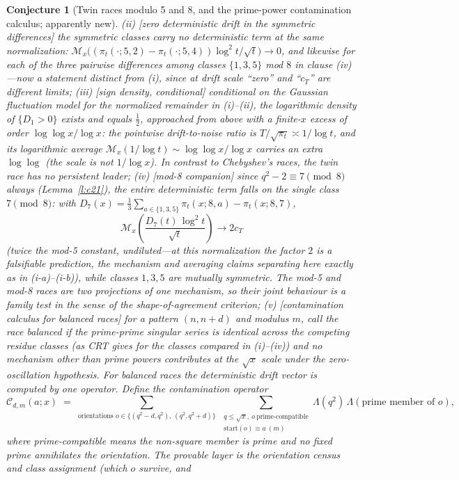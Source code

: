 \documentclass[11pt]{article}
\newtheorem{conjecture}{Conjecture}
\theoremstyle{definition}
\newcommand{\M}{\mathcal M}
\begin{document}
\begin{conjecture}[Twin races modulo 5 and 8, and the prime-power
contamination calculus; apparently new]
\emph{(ii)} [zero deterministic drift in the symmetric differences]
the symmetric classes carry no deterministic term \emph{at the same
normalization}:
$\M_x\bigl((\pi_t(\cdot;5,2)-\pi_t(\cdot;5,4))\log^2t/\sqrt
t\bigr)\to0$,
and likewise for each of the three pairwise differences among classes
$\{1,3,5\}$ mod $8$ in clause (iv)---now a statement distinct from (i),
since at drift scale ``zero'' and ``$c_T$'' are
different limits;
\emph{(iii)} [sign density, conditional] conditional on the Gaussian
fluctuation model for the normalized remainder in (i)--(ii), the
logarithmic density of $\{D_1>0\}$ exists and equals $\tfrac12$,
approached from above with a finite-$x$ excess of order
$\log\log x/\log x$: the pointwise drift-to-noise ratio is
$T/\sqrt{\pi_t}\asymp1/\log t$, and its \emph{logarithmic average}
$\M_x(1/\log t)\sim\log\log x/\log x$ carries an extra $\log\log$
(the scale is not $1/\log x$).  In contrast to Chebyshev's races, the twin
race has no
persistent leader;
\emph{(iv)} [mod-8 companion] since $q^2-2\equiv7\pmod8$ always
(Lemma~\ref{l:c21}), the \emph{entire} deterministic term falls on
the single class $7\pmod 8$: with
$D_7(x)=\tfrac13\sum_{a\in\{1,3,5\}}\pi_t(x;8,a)-\pi_t(x;8,7)$,
\[
\M_x\!\left(\frac{D_7(t)\,\log^2t}{\sqrt t}\right)
\longrightarrow2c_T
\]
(twice the mod-5 constant, undiluted---at this normalization the factor $2$
is a falsifiable prediction, the mechanism and averaging claims
separating here exactly as in (i-a)--(i-b)), while classes $1,3,5$
are mutually symmetric.  The mod-5 and mod-8 races are two projections of one
mechanism, so their joint behaviour is a family test in the sense of
the shape-of-agreement criterion;
\emph{(v)} [contamination calculus for balanced races] for a pattern
$(n,n+d)$ and modulus $m$, call the race \emph{balanced} if the
prime-prime singular series is identical across the competing residue
classes (as CRT gives for the classes compared in (i)--(iv)) and no
mechanism other than prime powers contributes at the $\sqrt x$ scale
under the zero-oscillation hypothesis.  For balanced races the
deterministic drift vector is computed by one operator.  Define the
\emph{contamination operator}
\[
\mathcal C_{d,m}(a;x)\;=\;
\sum_{\text{orientations }o\in\{(q^2-d,q^2),\,(q^2,q^2+d)\}}
\ \sum_{\substack{q\le\sqrt x,\ o\ \text{prime-compatible}\\
\mathrm{start}(o)\equiv a\ (m)}}
\Lambda(q^2)\,\Lambda(\text{prime member of }o),
\]
where prime-compatible means the non-square member is prime and no
fixed prime annihilates the orientation.  The provable layer is the
orientation census and class assignment (which $o$ survive, and

\end{conjecture}
\end{document}
